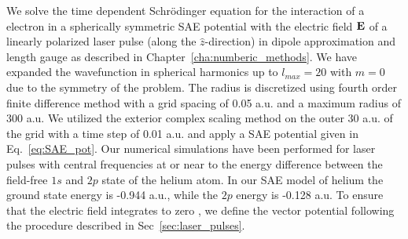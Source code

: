 We solve the time dependent Schr\"odinger equation for the interaction of a electron in a spherically symmetric SAE potential with the electric field ${\bf E}$ of a linearly polarized laser pulse (along the ${\hat z}$-direction) in dipole approximation and length gauge as described in Chapter~\ref{cha:numberic_methods}. We have expanded the wavefunction in spherical harmonics up to $l_{max} = 20$ with $m=0$ due to the symmetry of the problem. The radius is discretized using fourth order finite difference method with a grid spacing of 0.05 a.u. and a maximum radius of 300 a.u. We utilized the exterior complex scaling method on the outer 30 a.u. of the grid with a time step of  0.01 a.u. and
%
apply a SAE potential given in Eq.~\ref{eq:SAE_pot}.
Our numerical simulations have been performed for laser pulses with central frequencies at or near to the energy difference between the field-free $1s$ and $2p$ state of the helium atom. In our SAE model of helium the ground state energy is -0.944 a.u., while the $2p$ energy is -0.128 a.u. To ensure that the electric field 
integrates to zero \cite{chelkowski2002}, we define the vector potential following the procedure described in Sec~\ref{sec:laser_pulses}.

